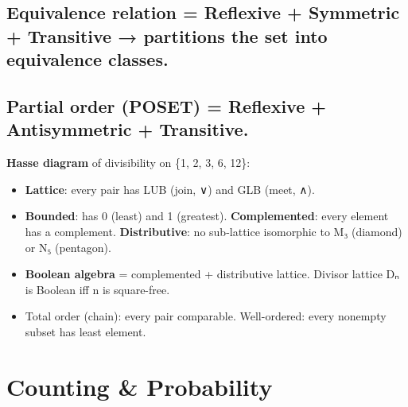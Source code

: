 \needspace{161pt}

\hypertarget{p2-01--equivalence-relation--reflexive--symmetric--transitive--partitions-the-set-into-equivalence-classes}{%
\subsection{\texorpdfstring{Equivalence relation = Reflexive + Symmetric + Transitive → partitions the set into \textbf{equivalence classes}.}{Equivalence relation = Reflexive + Symmetric + Transitive → partitions the set into equivalence classes.}}\label{p2-01--equivalence-relation--reflexive--symmetric--transitive--partitions-the-set-into-equivalence-classes}}

\needspace{125pt}

\hypertarget{p2-01--partial-order-poset--reflexive--antisymmetric--transitive}{%
\subsection{Partial order (POSET) = Reflexive + Antisymmetric + Transitive.}\label{p2-01--partial-order-poset--reflexive--antisymmetric--transitive}}

\textbf{Hasse diagram} of divisibility on \{1, 2, 3, 6, 12\}:



\begin{itemize}
\tightlist
\item
  \textbf{Lattice}: every pair has LUB (join, ∨) and GLB (meet, ∧).
\item
  \textbf{Bounded}: has 0 (least) and 1 (greatest). \textbf{Complemented}: every element has a complement. \textbf{Distributive}: no sub-lattice isomorphic to M₃ (diamond) or N₅ (pentagon).
\item
  \textbf{Boolean algebra} = complemented + distributive lattice. Divisor lattice Dₙ is Boolean iff n is square-free.
\item
  Total order (chain): every pair comparable. Well-ordered: every nonempty subset has least element.
\end{itemize}



\needspace{125pt}

\hypertarget{p2-01--3-counting--probability}{%
\section{Counting \& Probability}\label{p2-01--3-counting--probability}}

